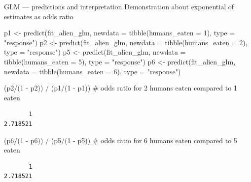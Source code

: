 \documentclass[
  10pt,
  ignorenonframetext,
  aspectratio=169,
  t]{beamer}
\newenvironment{Shaded}{\begin{snugshade}}{\end{snugshade}}
\newcommand{\AttributeTok}[1]{\textcolor[rgb]{0.40,0.45,0.13}{#1}}
\newcommand{\CommentTok}[1]{\textcolor[rgb]{0.37,0.37,0.37}{#1}}
\newcommand{\DecValTok}[1]{\textcolor[rgb]{0.68,0.00,0.00}{#1}}
\newcommand{\FunctionTok}[1]{\textcolor[rgb]{0.28,0.35,0.67}{#1}}
\newcommand{\NormalTok}[1]{\textcolor[rgb]{0.00,0.23,0.31}{#1}}
\newcommand{\OtherTok}[1]{\textcolor[rgb]{0.00,0.23,0.31}{#1}}
\newcommand{\SpecialCharTok}[1]{\textcolor[rgb]{0.37,0.37,0.37}{#1}}
\newcommand{\StringTok}[1]{\textcolor[rgb]{0.13,0.47,0.30}{#1}}
\begin{document}
\begin{frame}[fragile]{GLM --- predictions and interpretation}
\protect{}\label{glm-predictions-and-interpretation-4}
Demonstration about exponential of estimates as odds ratio

\footnotesize

\begin{Shaded}
\begin{Highlighting}[]
\NormalTok{p1 }\OtherTok{\textless{}{-}} \FunctionTok{predict}\NormalTok{(fit\_alien\_glm, }\AttributeTok{newdata =} \FunctionTok{tibble}\NormalTok{(}\AttributeTok{humans\_eaten =} \DecValTok{1}\NormalTok{), }\AttributeTok{type =} \StringTok{"response"}\NormalTok{)}
\NormalTok{p2 }\OtherTok{\textless{}{-}} \FunctionTok{predict}\NormalTok{(fit\_alien\_glm, }\AttributeTok{newdata =} \FunctionTok{tibble}\NormalTok{(}\AttributeTok{humans\_eaten =} \DecValTok{2}\NormalTok{), }\AttributeTok{type =} \StringTok{"response"}\NormalTok{)}
\NormalTok{p5 }\OtherTok{\textless{}{-}} \FunctionTok{predict}\NormalTok{(fit\_alien\_glm, }\AttributeTok{newdata =} \FunctionTok{tibble}\NormalTok{(}\AttributeTok{humans\_eaten =} \DecValTok{5}\NormalTok{), }\AttributeTok{type =} \StringTok{"response"}\NormalTok{)}
\NormalTok{p6 }\OtherTok{\textless{}{-}} \FunctionTok{predict}\NormalTok{(fit\_alien\_glm, }\AttributeTok{newdata =} \FunctionTok{tibble}\NormalTok{(}\AttributeTok{humans\_eaten =} \DecValTok{6}\NormalTok{), }\AttributeTok{type =} \StringTok{"response"}\NormalTok{)}

\NormalTok{(p2}\SpecialCharTok{/}\NormalTok{(}\DecValTok{1} \SpecialCharTok{{-}}\NormalTok{ p2)) }\SpecialCharTok{/}\NormalTok{ (p1}\SpecialCharTok{/}\NormalTok{(}\DecValTok{1} \SpecialCharTok{{-}}\NormalTok{ p1)) }\CommentTok{\# odds ratio for 2 humans eaten compared to 1 eaten}
\end{Highlighting}
\end{Shaded}

\begin{verbatim}
       1 
2.718521 
\end{verbatim}

\begin{Shaded}
\begin{Highlighting}[]
\NormalTok{(p6}\SpecialCharTok{/}\NormalTok{(}\DecValTok{1} \SpecialCharTok{{-}}\NormalTok{ p6)) }\SpecialCharTok{/}\NormalTok{ (p5}\SpecialCharTok{/}\NormalTok{(}\DecValTok{1} \SpecialCharTok{{-}}\NormalTok{ p5)) }\CommentTok{\# odds ratio for 6 humans eaten compared to 5 eaten}
\end{Highlighting}
\end{Shaded}

\begin{verbatim}
       1 
2.718521 
\end{verbatim}

\normalsize
\end{frame}
\end{document}
